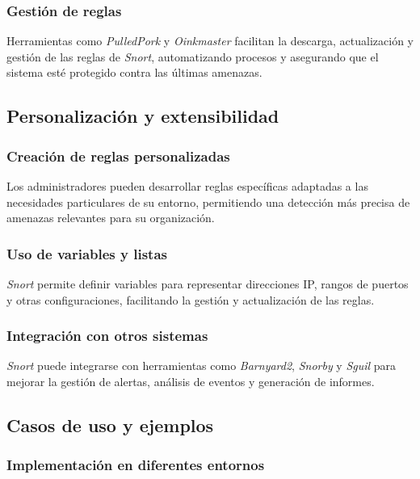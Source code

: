 \documentclass[11pt,a4paper,twoside]{report}
\begin{document}
\subsubsection{Gestión de reglas}

Herramientas como \textit{PulledPork} y \textit{Oinkmaster} facilitan la descarga, actualización y gestión de las reglas de \textit{Snort}, automatizando procesos y asegurando que el sistema esté protegido contra las últimas amenazas.

\subsection{Personalización y extensibilidad}

\subsubsection{Creación de reglas personalizadas}

Los administradores pueden desarrollar reglas específicas adaptadas a las necesidades particulares de su entorno, permitiendo una detección más precisa de amenazas relevantes para su organización.

\subsubsection{Uso de variables y listas}

\textit{Snort} permite definir variables para representar direcciones IP, rangos de puertos y otras configuraciones, facilitando la gestión y actualización de las reglas.

\subsubsection{Integración con otros sistemas}

\textit{Snort} puede integrarse con herramientas como \textit{Barnyard2}, \textit{Snorby} y \textit{Sguil} para mejorar la gestión de alertas, análisis de eventos y generación de informes.

\subsection{Casos de uso y ejemplos}

\subsubsection{Implementación en diferentes entornos}
\end{document}
